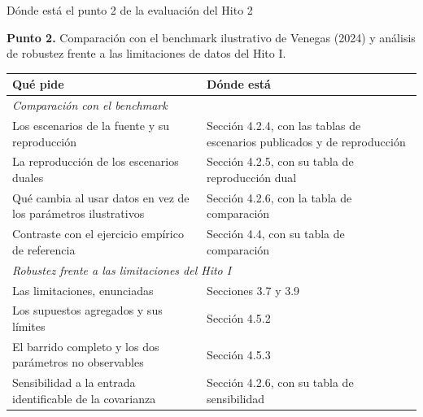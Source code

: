 \documentclass[aspectratio=169]{beamer}
\begin{document}
\begin{frame}{Dónde está el punto 2 de la evaluación del Hito 2}

\scriptsize
\textbf{Punto 2.} Comparación con el benchmark ilustrativo de Venegas (2024) y análisis de robustez frente a las limitaciones de datos del Hito I.

\vspace{0.25cm}
\begin{table}
\centering
\scriptsize
\begin{tabular}{p{5.2cm}p{6.5cm}}
\toprule
Qué pide & Dónde está \\
\midrule
\multicolumn{2}{l}{\textit{Comparación con el benchmark}} \\
Los escenarios de la fuente y su reproducción & Sección 4.2.4, con las tablas de escenarios publicados y de reproducción \\
La reproducción de los escenarios duales & Sección 4.2.5, con su tabla de reproducción dual \\
Qué cambia al usar datos en vez de los parámetros ilustrativos & Sección 4.2.6, con la tabla de comparación \\
Contraste con el ejercicio empírico de referencia & Sección 4.4, con su tabla de comparación \\
\midrule
\multicolumn{2}{l}{\textit{Robustez frente a las limitaciones del Hito I}} \\
Las limitaciones, enunciadas & Secciones 3.7 y 3.9 \\
Los supuestos agregados y sus límites & Sección 4.5.2 \\
El barrido completo y los dos parámetros no observables & Sección 4.5.3 \\
Sensibilidad a la entrada identificable de la covarianza & Sección 4.2.6, con su tabla de sensibilidad \\
\bottomrule
\end{tabular}
\end{table}

\end{frame}
\end{document}
